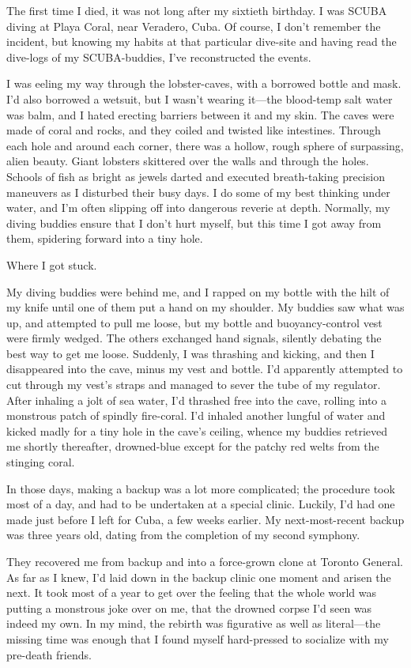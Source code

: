 The first time I died, it was not long after my sixtieth birthday.
I was SCUBA diving at Playa Coral, near Veradero, Cuba. Of course,
I don't remember the incident, but knowing my habits at that
particular dive-site and having read the dive-logs of my
SCUBA-buddies, I've reconstructed the events.

I was eeling my way through the lobster-caves, with a borrowed
bottle and mask. I'd also borrowed a wetsuit, but I wasn't wearing
it—the blood-temp salt water was balm, and I hated erecting
barriers between it and my skin. The caves were made of coral and
rocks, and they coiled and twisted like intestines. Through each
hole and around each corner, there was a hollow, rough sphere of
surpassing, alien beauty. Giant lobsters skittered over the walls
and through the holes. Schools of fish as bright as jewels darted
and executed breath-taking precision maneuvers as I disturbed their
busy days. I do some of my best thinking under water, and I'm often
slipping off into dangerous reverie at depth. Normally, my diving
buddies ensure that I don't hurt myself, but this time I got away
from them, spidering forward into a tiny hole.

Where I got stuck.

My diving buddies were behind me, and I rapped on my bottle with
the hilt of my knife until one of them put a hand on my shoulder.
My buddies saw what was up, and attempted to pull me loose, but my
bottle and buoyancy-control vest were firmly wedged. The others
exchanged hand signals, silently debating the best way to get me
loose. Suddenly, I was thrashing and kicking, and then I
disappeared into the cave, minus my vest and bottle. I'd apparently
attempted to cut through my vest's straps and managed to sever the
tube of my regulator. After inhaling a jolt of sea water, I'd
thrashed free into the cave, rolling into a monstrous patch of
spindly fire-coral. I'd inhaled another lungful of water and kicked
madly for a tiny hole in the cave's ceiling, whence my buddies
retrieved me shortly thereafter, drowned-blue except for the patchy
red welts from the stinging coral.

In those days, making a backup was a lot more complicated; the
procedure took most of a day, and had to be undertaken at a special
clinic. Luckily, I'd had one made just before I left for Cuba, a
few weeks earlier. My next-most-recent backup was three years old,
dating from the completion of my second symphony.

They recovered me from backup and into a force-grown clone at
Toronto General. As far as I knew, I'd laid down in the backup
clinic one moment and arisen the next. It took most of a year to
get over the feeling that the whole world was putting a monstrous
joke over on me, that the drowned corpse I'd seen was indeed my
own. In my mind, the rebirth was figurative as well as literal—the
missing time was enough that I found myself hard-pressed to
socialize with my pre-death friends.

